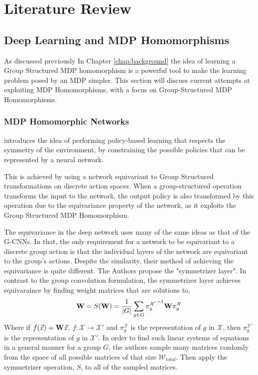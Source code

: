 \chapter{Literature Review}\label{chap:litreview}

\section{Deep Learning and MDP Homomorphisms}
As discussed previously In Chapter \ref{chap:background} the idea of learning a Group Structured MDP homomorphism is a powerful tool to make the learning problem posed by an MDP simpler. This section will discuss current attempts at exploiting MDP Homomorphisms, with a focus on Group-Structured MDP Homomorphisms.
\subsection{MDP Homomorphic Networks}
\cite{vanderpol2020mdp} introduces the idea of performing policy-based learning that respects the symmetry of the environment, by constraining the possible policies that can be represented by a neural network.

This is achieved by using a network equivariant to Group Structured transformations on discrete action spaces. When a group-structured operation transforms the input to the network, the output policy is also transformed by this operation due to the equivariance property of the network, as it exploits the Group Structured MDP Homomorphism.

The equivariance in the deep network uses many of the same ideas as that of the G-CNNs\cite{cohen2016group}. In that, the only requirement for a network to be equivariant to a discrete group action is that the individual layers of the network are equivariant to the group's actions. Despite the similarity, their method of achieving the equivariance is quite different. The Authors propose the "symmetrizer layer". In contrast to the group convolution formulation, the symmetrizer layer achieves equivaraince by finding weight matrices that are solutions to,
\begin{equation}
	\label{eqn:symmetrizer}
	\mathbf{W} =S(\mathbf{W}) = \frac{1}{|G|}\sum_{g\in G}{\pi_g^{\mathcal{X}'}}^{-1}\mathbf{W}\pi_g^{\mathcal{X}}
\end{equation}
Where if $f(\vec{x}) = \mathbf{W}\vec{x}$, $f: \mathcal{X} \rightarrow {\mathcal{X}'}$ and $\pi_g^{\mathcal{X}}$ is the representation of $g$ in $\mathcal{X}$, then $\pi_g^{\mathcal{X}'}$ is the representation of $g$ in $\mathcal{X}'$. In order to find such linear systems of equations in a general manner for a group $G$, the authors sample many matrices randomly from the space of all possible matrices of that size $\mathcal{W}_{total}$. Then apply the symmetrizer operation, $S$, to all of the sampled matrices.


